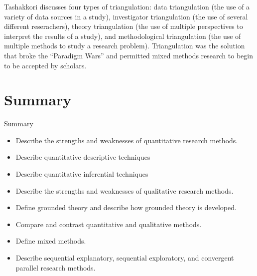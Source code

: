 Tashakkori\cite{tashakkori1998mixed} discusses four types of triangulation: data triangulation (the use of a variety of data sources in a study), investigator triangulation (the use of several different reserachers), theory triangulation (the use of multiple perspectives to interpret the results of a study), and methodological triangulation (the use of multiple methods to study a research problem). Triangulation was the solution that broke the ``Paradigm Wars'' and permitted mixed methods research to begin to be accepted by scholars.

\section{Summary}

\begin{center}
	\begin{tkawybox}{Summary}
		\begin{itemize}
			\setlength{\itemsep}{0pt}
			\setlength{\parskip}{0pt}
			\setlength{\parsep}{0pt}
			
			\item Describe the strengths and weaknesses of quantitative research methods.
			\item Describe quantitative descriptive techniques
			\item Describe quantitative inferential techniques
			\item Describe the strengths and weaknesses of qualitative research methods.
			\item Define grounded theory and describe how grounded theory is developed.
			\item Compare and contrast quantitative and qualitative methods.
			\item Define mixed methods.
			\item Describe sequential explanatory, sequential exploratory, and convergent parallel research methods.
		\end{itemize}
	\end{tkawybox}
\end{center}
